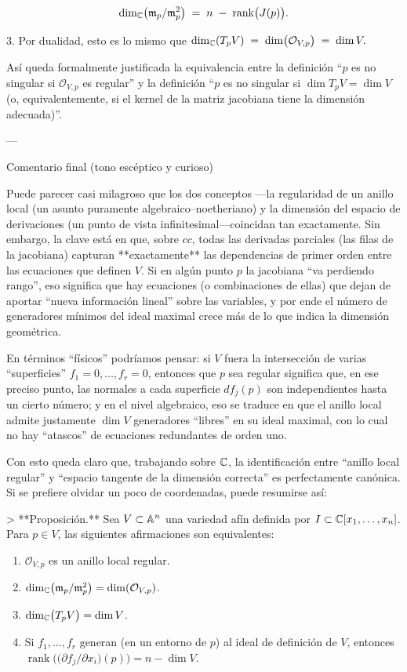    $$
     \dim_{\mathbb{C}}\bigl(\mathfrak m_p / \mathfrak m_p^2\bigr)
     \;=\;
     n \;-\; \operatorname{rank}\bigl(J(p)\bigr).
   $$

3. Por dualidad, esto es lo mismo que
   $\displaystyle
     \dim_{\mathbb{C}}(T_p V)
     \;=\;
     \dim\bigl(\mathcal O_{V,p}\bigr)
     \;=\;
     \dim V.
   $

Así queda formalmente justificada la equivalencia entre la definición “$p$ es no singular si $\mathcal O_{V,p}$ es regular” y la definición “$p$ es no singular si $\dim T_p V = \dim V$ (o, equivalentemente, si el kernel de la matriz jacobiana tiene la dimensión adecuada)”.

---

Comentario final (tono escéptico y curioso)

Puede parecer casi milagroso que los dos conceptos —la regularidad de un anillo local (un asunto puramente algebraico–noetheriano) y la dimensión del espacio de derivaciones (un punto de vista infinitesimal—coincidan tan exactamente. Sin embargo, la clave está en que, sobre $cc$, todas las derivadas parciales (las filas de la jacobiana) capturan **exactamente** las dependencias de primer orden entre las ecuaciones que definen $V$. Si en algún punto $p$ la jacobiana “va perdiendo rango”, eso significa que hay ecuaciones (o combinaciones de ellas) que dejan de aportar “nueva información lineal” sobre las variables, y por ende el número de generadores mínimos del ideal maximal crece más de lo que indica la dimensión geométrica.

En términos “físicos” podríamos pensar: si $V$ fuera la intersección de varias “superficies” $f_1=0,\dots,f_r=0$, entonces que $p$ sea regular significa que, en ese preciso punto, las normales a cada superficie $df_j(p)$ son independientes hasta un cierto número; y en el nivel algebraico, eso se traduce en que el anillo local admite justamente $\dim V$ generadores “libres” en su ideal maximal, con lo cual no hay “atascos” de ecuaciones redundantes de orden uno.

Con esto queda claro que, trabajando sobre $\mathbb{C}$, la identificación entre “anillo local regular” y “espacio tangente de la dimensión correcta” es perfectamente canónica. Si se prefiere olvidar un poco de coordenadas, puede resumirse así:

> **Proposición.** Sea $V\subset \mathbb{A}^n$ una variedad afín definida por $I\subset \mathbb{C}[x_1,\dots,x_n]$. Para $p\in V$, las siguientes afirmaciones son equivalentes:
\begin{enumerate}
	\item $\mathcal O_{V,p}$ es un anillo local regular.
	\item $\dim_{\mathbb{C}}\bigl(\mathfrak m_p/\mathfrak m_p^2\bigr) = \dim(\mathcal O_{V,p})$.
	\item  $\dim_{\mathbb{C}}\bigl(T_p V\bigr) = \dim V$.
	\item Si $f_1,\dots,f_r$ generan (en un entorno de $p$) al ideal de definición de $V$, entonces $\operatorname{rank}\bigl(\bigl(\partial f_j/\partial x_i\bigr)(p)\bigr) = n - \dim V$.
\end{enumerate}

